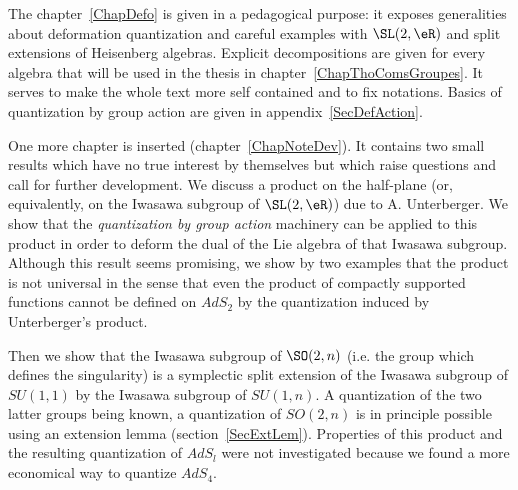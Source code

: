 The chapter~\ref{ChapDefo} is given in a pedagogical purpose: it exposes generalities about deformation quantization and careful examples with $\SL(2,\eR)$ and split extensions of Heisenberg algebras. Explicit decompositions are given for every algebra that will be used in the thesis in chapter~\ref{ChapThoComsGroupes}. It serves to make the whole text more self contained and to fix notations. Basics of quantization by group action are given in appendix~\ref{SecDefAction}.

One more chapter is inserted (chapter~\ref{ChapNoteDev}). It contains two small results which have no true interest by themselves but which raise questions and call for further development. We discuss a product on the half-plane (or, equivalently, on the Iwasawa subgroup of $\SL(2,\eR)$) due to A. Unterberger. We show that the \emph{quantization by group action} machinery can be applied to this product in order to deform the dual of the Lie algebra of that Iwasawa subgroup. Although this result seems promising, we show by two examples that the product is not universal in the sense that even the product of compactly supported functions cannot be defined on $AdS_2$ by the quantization induced by Unterberger's product.

Then we show that the Iwasawa subgroup of $\SO(2,n)$ (i.e. the group which defines the singularity) is a symplectic split extension of the Iwasawa subgroup of $SU(1,1)$ by the Iwasawa subgroup of $SU(1,n)$. A quantization of the two latter groups being known, a quantization of $SO(2,n)$ is in principle possible using an extension lemma (section~\ref{SecExtLem}). Properties of this product and the resulting quantization of $AdS_l$ were not investigated because we found a more economical way to quantize $AdS_4$.
